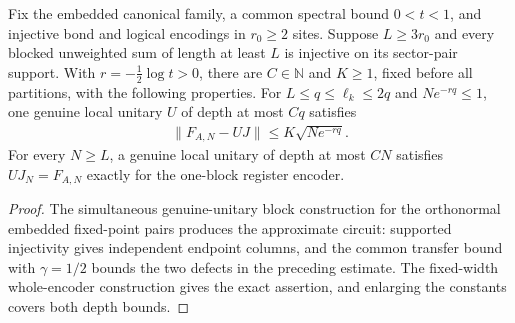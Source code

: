 \begin{lemma}
    \label{thm:ldp_uniform_sector_encoding}
    \leanok
    Fix the embedded canonical family, a common spectral bound $0<t<1$,
    and injective bond and logical encodings in $r_0\ge2$ sites. Suppose
    $L\ge3r_0$ and every blocked unweighted sum of length at least $L$ is
    injective on its sector-pair support. With $r=-\tfrac12\log t>0$,
    there are $C\in\mathbb N$ and $K\ge1$, fixed before all partitions,
    with the following properties.
    For $L\le q\le\ell_k\le2q$ and $Ne^{-rq}\le1$, one genuine local
    unitary $U$ of depth at most $Cq$ satisfies
    \begin{align*}
        \|F_{A,N}-UJ\|\le K\sqrt{Ne^{-rq}}.
    \end{align*}
    For every $N\ge L$, a genuine local unitary of depth at most $CN$
    satisfies $UJ_N=F_{A,N}$ exactly for the one-block register encoder.
\end{lemma}
\begin{proof}\leanok
    The simultaneous genuine-unitary block construction for the
    orthonormal embedded fixed-point pairs produces the approximate circuit: supported injectivity gives
    independent endpoint columns, and the common transfer bound with
    $\gamma=1/2$ bounds the two defects in the preceding estimate.
    The fixed-width whole-encoder construction gives the exact assertion, and enlarging
    the constants covers both depth bounds.
\end{proof}


